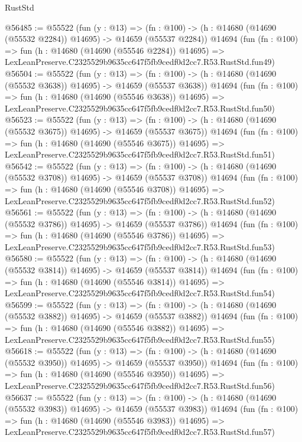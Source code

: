 \begin{lexlean}{RustStd}
\begin{coremodule}
@56485 := @55522
    (fun (y : @13) =>
    (fn : @100) -> (h : @14680 (@14690 (@55532 @2284)) @14695) -> @14659 (@55537 @2284))
    @14694
    (fun (fn : @100) =>
    fun (h : @14680 (@14690 (@55546 @2284)) @14695) =>
    LexLeanPreserve.C2325529b9635cc647f5fb9cedf0d2cc7.R53.RustStd.fun49)
@56504 := @55522
    (fun (y : @13) =>
    (fn : @100) -> (h : @14680 (@14690 (@55532 @3638)) @14695) -> @14659 (@55537 @3638))
    @14694
    (fun (fn : @100) =>
    fun (h : @14680 (@14690 (@55546 @3638)) @14695) =>
    LexLeanPreserve.C2325529b9635cc647f5fb9cedf0d2cc7.R53.RustStd.fun50)
@56523 := @55522
    (fun (y : @13) =>
    (fn : @100) -> (h : @14680 (@14690 (@55532 @3675)) @14695) -> @14659 (@55537 @3675))
    @14694
    (fun (fn : @100) =>
    fun (h : @14680 (@14690 (@55546 @3675)) @14695) =>
    LexLeanPreserve.C2325529b9635cc647f5fb9cedf0d2cc7.R53.RustStd.fun51)
@56542 := @55522
    (fun (y : @13) =>
    (fn : @100) -> (h : @14680 (@14690 (@55532 @3708)) @14695) -> @14659 (@55537 @3708))
    @14694
    (fun (fn : @100) =>
    fun (h : @14680 (@14690 (@55546 @3708)) @14695) =>
    LexLeanPreserve.C2325529b9635cc647f5fb9cedf0d2cc7.R53.RustStd.fun52)
@56561 := @55522
    (fun (y : @13) =>
    (fn : @100) -> (h : @14680 (@14690 (@55532 @3786)) @14695) -> @14659 (@55537 @3786))
    @14694
    (fun (fn : @100) =>
    fun (h : @14680 (@14690 (@55546 @3786)) @14695) =>
    LexLeanPreserve.C2325529b9635cc647f5fb9cedf0d2cc7.R53.RustStd.fun53)
@56580 := @55522
    (fun (y : @13) =>
    (fn : @100) -> (h : @14680 (@14690 (@55532 @3814)) @14695) -> @14659 (@55537 @3814))
    @14694
    (fun (fn : @100) =>
    fun (h : @14680 (@14690 (@55546 @3814)) @14695) =>
    LexLeanPreserve.C2325529b9635cc647f5fb9cedf0d2cc7.R53.RustStd.fun54)
@56599 := @55522
    (fun (y : @13) =>
    (fn : @100) -> (h : @14680 (@14690 (@55532 @3882)) @14695) -> @14659 (@55537 @3882))
    @14694
    (fun (fn : @100) =>
    fun (h : @14680 (@14690 (@55546 @3882)) @14695) =>
    LexLeanPreserve.C2325529b9635cc647f5fb9cedf0d2cc7.R53.RustStd.fun55)
@56618 := @55522
    (fun (y : @13) =>
    (fn : @100) -> (h : @14680 (@14690 (@55532 @3950)) @14695) -> @14659 (@55537 @3950))
    @14694
    (fun (fn : @100) =>
    fun (h : @14680 (@14690 (@55546 @3950)) @14695) =>
    LexLeanPreserve.C2325529b9635cc647f5fb9cedf0d2cc7.R53.RustStd.fun56)
@56637 := @55522
    (fun (y : @13) =>
    (fn : @100) -> (h : @14680 (@14690 (@55532 @3983)) @14695) -> @14659 (@55537 @3983))
    @14694
    (fun (fn : @100) =>
    fun (h : @14680 (@14690 (@55546 @3983)) @14695) =>
    LexLeanPreserve.C2325529b9635cc647f5fb9cedf0d2cc7.R53.RustStd.fun57)

\end{coremodule}
\end{lexlean}
